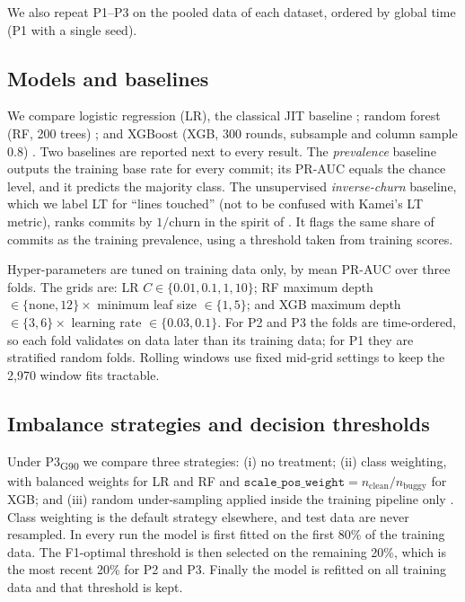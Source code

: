 \documentclass[11pt,a4paper]{article}
\newcommand{\pthree}{P3\textsubscript{G90}}
\begin{document}
We also repeat P1--P3 on the pooled data of each dataset, ordered by global time (P1 with a single seed).

\subsection{Models and baselines}\label{sec:models}

We compare logistic regression (LR), the classical JIT baseline \citep{kamei2013}; random forest (RF, 200 trees) \citep{breiman2001}; and XGBoost (XGB, 300 rounds, subsample and column sample 0.8) \citep{chen2016}. Two baselines are reported next to every result. The \emph{prevalence} baseline outputs the training base rate for every commit; its PR-AUC equals the chance level, and it predicts the majority class. The unsupervised \emph{inverse-churn} baseline, which we label LT for ``lines touched'' (not to be confused with Kamei's LT metric), ranks commits by $1/\text{churn}$ in the spirit of \citet{yang2016}. It flags the same share of commits as the training prevalence, using a threshold taken from training scores.

Hyper-parameters are tuned on training data only, by mean PR-AUC over three folds. The grids are: LR $C\in\{0.01,0.1,1,10\}$; RF maximum depth $\in\{\text{none},12\}\times$ minimum leaf size $\in\{1,5\}$; and XGB maximum depth $\in\{3,6\}\times$ learning rate $\in\{0.03,0.1\}$. For P2 and P3 the folds are time-ordered, so each fold validates on data later than its training data; for P1 they are stratified random folds. Rolling windows use fixed mid-grid settings to keep the 2{,}970 window fits tractable.

\subsection{Imbalance strategies and decision thresholds}\label{sec:imbalance}

Under \pthree{} we compare three strategies: (i) no treatment; (ii) class weighting, with balanced weights for LR and RF and $\texttt{scale\_pos\_weight}=n_{\text{clean}}/n_{\text{buggy}}$ for XGB; and (iii) random under-sampling applied inside the training pipeline only \citep{lemaitre2017}. Class weighting is the default strategy elsewhere, and test data are never resampled. In every run the model is first fitted on the first 80\% of the training data. The F1-optimal threshold is then selected on the remaining 20\%, which is the most recent 20\% for P2 and P3. Finally the model is refitted on all training data and that threshold is kept.
\end{document}
